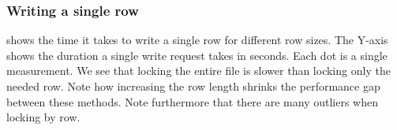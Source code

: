 \subsubsection*{Writing a single row}
 shows the time it takes to write a single row for different row sizes. The Y-axis shows the duration a single write request takes in seconds. Each dot is a single measurement. We see that locking the entire file is slower than locking only the needed row. Note how increasing the row length shrinks the performance gap between these methods. Note furthermore that there are many outliers when locking by row.

